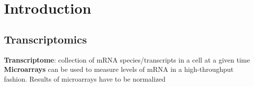 
\chapter{Introduction}

\section{Transcriptomics}
\textbf{Transcriptome}: collection of mRNA species/transcripts in a cell at a given time\\

\textbf{Microarrays} can be used to measure levels of mRNA in a high-throughput fashion. Results of microarrays have to be normalized \cite{smythNormalizationCDNAMicroarray2003}
\cite{caddeoTissueEngineeringApproaches2017}

\cite{devlin2002sex}
